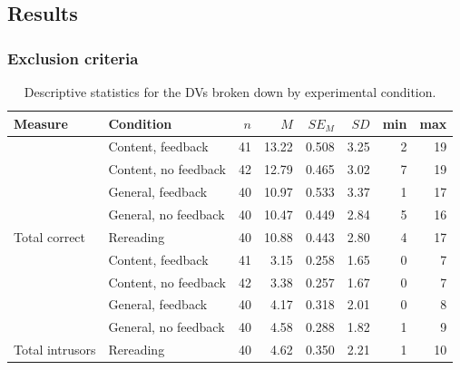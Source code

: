 \documentclass[11pt,]{article}
\begin{document}
\hypertarget{results}{%
\subsection{Results}\label{results}}

\hypertarget{exclusion-criteria}{%
\subsubsection{Exclusion criteria}\label{exclusion-criteria}}

\begin{table}[t]

\caption{\label{tab:descTable}\label{descTable}Descriptive statistics for the DVs broken down
                     by experimental condition.}
\centering
\begin{tabular}{llrrrrrr}
\toprule
Measure & Condition & $n$ & $M$ & $SE_M$ & $SD$ & min & max\\
\midrule
 & Content, feedback & 41 & 13.22 & 0.508 & 3.25 & 2 & 19\\

 & Content, no feedback & 42 & 12.79 & 0.465 & 3.02 & 7 & 19\\

 & General, feedback & 40 & 10.97 & 0.533 & 3.37 & 1 & 17\\

 & General, no feedback & 40 & 10.47 & 0.449 & 2.84 & 5 & 16\\

\multirow{-5}{*}{\raggedright\arraybackslash Total correct} & Rereading & 40 & 10.88 & 0.443 & 2.80 & 4 & 17\\
\cmidrule{1-8}
 & Content, feedback & 41 & 3.15 & 0.258 & 1.65 & 0 & 7\\

 & Content, no feedback & 42 & 3.38 & 0.257 & 1.67 & 0 & 7\\

 & General, feedback & 40 & 4.17 & 0.318 & 2.01 & 0 & 8\\

 & General, no feedback & 40 & 4.58 & 0.288 & 1.82 & 1 & 9\\

\multirow{-5}{*}{\raggedright\arraybackslash Total intrusors} & Rereading & 40 & 4.62 & 0.350 & 2.21 & 1 & 10\\
\bottomrule
\end{tabular}
\end{table}
\end{document}
